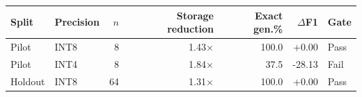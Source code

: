 \begin{tabular}{@{}llrrrrl@{}}
\toprule
Split & Precision & $n$ & Storage reduction & Exact gen.\% & $\Delta$F1 & Gate \\
\midrule
Pilot & INT8 & 8 & 1.43$\times$ & 100.0 & +0.00 & Pass \\
Pilot & INT4 & 8 & 1.84$\times$ & 37.5 & -28.13 & Fail \\
Holdout & INT8 & 64 & 1.31$\times$ & 100.0 & +0.00 & Pass \\
\bottomrule
\end{tabular}
